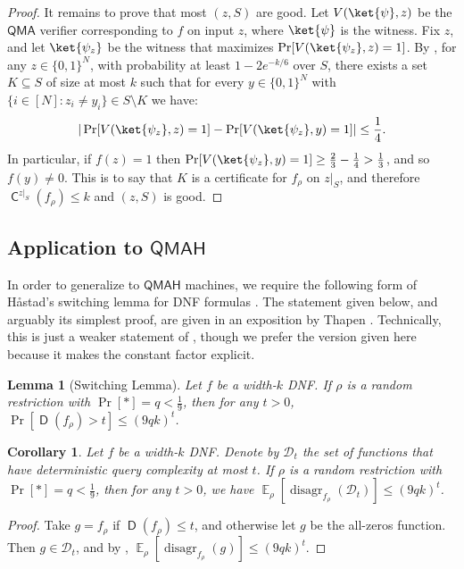 \documentclass[11pt]{article}%
\newtheorem{corollary}[theorem]{Corollary}
\newtheorem{lemma}[theorem]{Lemma}
\newcommand{\E}{\mathop{\mathbb{E}}}
\DeclareMathOperator{\disagr}{\mathrm{disagr}}
\DeclareMathOperator{\D}{\mathsf{D}}
\DeclareMathOperator{\C}{\mathsf{C}}
\begin{document}
\begin{proof}
It remains to prove that most $(z, S)$ are good. Let $V(\ket{\psi},z)$ be the $\mathsf{QMA}$ verifier corresponding to $f$ on input $z$, where $\ket{\psi}$ is the witness. Fix $z$, and let $\ket{\psi_z}$ be the witness that maximizes $\Pr[V(\ket{\psi_z},z) = 1]$. By , for any $z \in \{0,1\}^N$, with probability at least $1 - 2e^{-k/6}$ over $S$, there exists a set $K \subseteq S$ of size at most $k$ such that for every $y \in \{0,1\}^N$ with $\{i \in [N] : z_i \neq y_i\} \in S \setminus K$ we have:
\[|\Pr[V(\ket{\psi_z},z) = 1] - \Pr[V(\ket{\psi_z},y) = 1]| \le \frac{1}{4}.\]
In particular, if $f(z) = 1$ then $\Pr[V(\ket{\psi_z},y) = 1] \ge \frac{2}{3} - \frac{1}{4} > \frac{1}{3}$, and so $f(y) \neq 0$. This is to say that $K$ is a certificate for $f_\rho$ on $z|_S$, and therefore $\C^{z|_S}(f_\rho) \le k$ and $(z, S)$ is good.
\end{proof}

\subsection{Application to \texorpdfstring{$\mathsf{QMAH}$}{QMAH}}

In order to generalize  to $\mathsf{QMAH}$ machines, we require the following form of H\r{a}stad's switching lemma for DNF formulas \cite{Has87}. The statement given below, and arguably its simplest proof, are given in an exposition by Thapen \cite{Tha09}. Technically, this is just a weaker statement of , though we prefer the version given here because it makes the constant factor explicit.

\begin{lemma}[Switching Lemma]
\label{lem:dnf_random_restriction}
Let $f$ be a width-$k$ DNF. If $\rho$ is a random restriction with $\Pr[*] = q < \frac{1}{9}$, then for any $t > 0$, $\Pr\left[\D(f_\rho) > t \right] \le (9qk)^t$.
\end{lemma}

\begin{corollary}
\label{cor:dnf_random_restriction}
Let $f$ be a width-$k$ DNF. Denote by $\mathcal{D}_t$ the set of functions that have deterministic query complexity at most $t$. If $\rho$ is a random restriction with $\Pr[*] = q < \frac{1}{9}$, then for any $t > 0$, we have $\E_\rho[\disagr_{f_\rho}\left(\mathcal{D}_t\right)] \le (9qk)^t$.
\end{corollary}

\begin{proof}
Take $g = f_\rho$ if $\D(f_\rho) \le t$, and otherwise let $g$ be the all-zeros function. Then $g \in \mathcal{D}_t$, and by , $\E_\rho[\disagr_{f_\rho}\left(g\right)] \le (9qk)^t$.
\end{proof}
\end{document}
